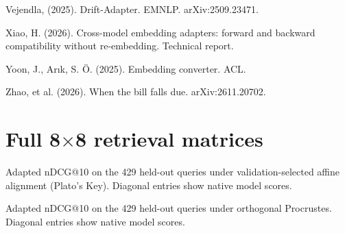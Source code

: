 \documentclass{article}
\begin{document}
\begin{thebibliography}{99}
Vejendla, (2025). Drift-Adapter. EMNLP. arXiv:2509.23471.

Xiao, H. (2026). Cross-model embedding adapters: forward and backward compatibility without re-embedding. Technical report.

Yoon, J., Ar{\i}k, S. \"O. (2025). Embedding converter. ACL.

Zhao, et al. (2026). When the bill falls due. arXiv:2611.20702.

\end{thebibliography}

\clearpage
\appendix
\section{Full 8$\times$8 retrieval matrices}

\begin{table}[ht]
\centering
\caption{Adapted nDCG@10 on the 429 held-out queries under validation-selected affine alignment (Plato's Key). Diagonal entries show native model scores.}
\label{tab:matrix_affine}

\end{table}

\begin{table}[ht]
\centering
\caption{Adapted nDCG@10 on the 429 held-out queries under orthogonal Procrustes. Diagonal entries show native model scores.}
\label{tab:matrix_proc}

\end{table}
\end{document}
